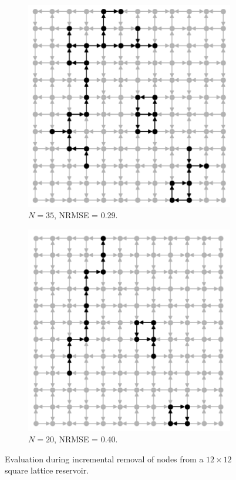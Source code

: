 \begin{figure}[htb]
  \begin{subfigure}{.40\textwidth}
    \centering
    \includegraphics[width=1.0\linewidth]{figures/sq-grid-35.png}
    \caption{$N = 35$, NRMSE = 0.29.}
    \label{fig:sq-grid-35}
  \end{subfigure}
  \begin{subfigure}{.40\textwidth}
    \centering
    \includegraphics[width=1.0\linewidth]{figures/sq-grid-20.png}
    \caption{$N = 20$, NRMSE = 0.40.}
    \label{fig:sq-grid-20}
  \end{subfigure}
  \caption{
    Evaluation during incremental removal of nodes from a $12 \times 12$ square
lattice reservoir.
  }
  \label{fig:sq-grid}
\end{figure}

